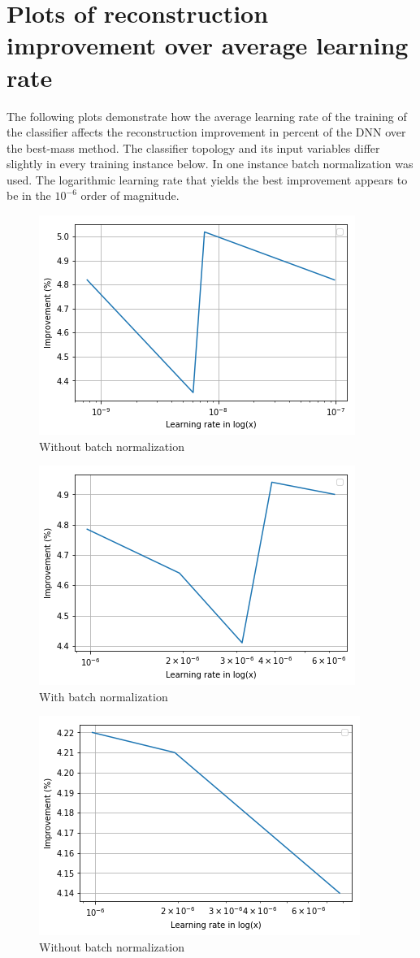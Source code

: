 \chapter{Plots of reconstruction improvement over average learning rate}
The following plots demonstrate how the average learning rate of the training of the classifier affects the reconstruction improvement in percent of the DNN over the best-mass method. The classifier topology and its input variables differ slightly in every training instance below. In one instance batch normalization was used. The logarithmic learning rate that yields the best improvement appears to be in the $10^{-6}$ order of magnitude.

\begin{figure}[h]
    \centering
    \includegraphics[width=.5\textwidth]{assets/appendix/plot_group25.png}
    \caption{Without batch normalization}
    \label{fig:ch_5_plot25}
\end{figure}
\begin{figure}[h]
    \centering
    \includegraphics[width=.5\textwidth]{assets/appendix/plot_group21.png}
    \caption{With batch normalization}
    \label{fig:ch_5_plot21}
\end{figure}
\begin{figure}[h]
    \centering
    \includegraphics[width=.65\textwidth]{assets/appendix/plot_group23.png}
    \caption{Without batch normalization}
    \label{fig:ch_5_plot25}
\end{figure}
